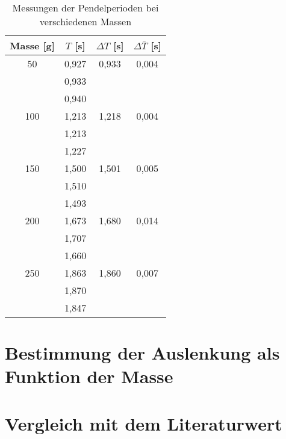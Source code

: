 \begin{table}[h!]
    \centering
    \begin{tabular}{c | c | c | c}
    Masse [g] & $T$ [s] & $\Delta T$ [s] & $\Delta \bar{T}$ [s] \\
    \hline
    50  & 0,927 & 0,933 & 0,004 \\
        & 0,933 &       &       \\
        & 0,940 &       &       \\
    \hline
    100 & 1,213 & 1,218 & 0,004 \\
        & 1,213 &       &       \\
        & 1,227 &       &       \\
    \hline
    150 & 1,500 & 1,501 & 0,005 \\
        & 1,510 &       &       \\
        & 1,493 &       &       \\
    \hline
    200 & 1,673 & 1,680 & 0,014 \\
        & 1,707 &       &       \\
        & 1,660 &       &       \\
    \hline
    250 & 1,863 & 1,860 & 0,007 \\
        & 1,870 &       &       \\
        & 1,847 &       &       \\
    \hline
    \end{tabular}
    \caption{Messungen der Pendelperioden bei verschiedenen Massen}
    \label{tab:verschiedene_massen_messungen}
\end{table}



\section{Bestimmung der Auslenkung als Funktion der Masse}
\section{Vergleich mit dem Literaturwert} 